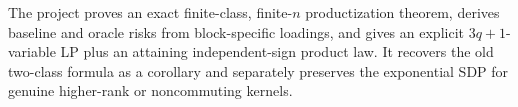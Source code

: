 The project proves an exact finite-class, finite-\(n\) productization theorem, derives baseline and oracle risks from block-specific loadings, and gives an explicit \(3q+1\)-variable LP plus an attaining independent-sign product law. It recovers the old two-class formula as a corollary and separately preserves the exponential SDP for genuine higher-rank or noncommuting kernels.